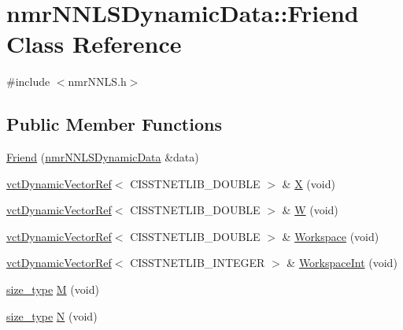 \hypertarget{classnmr_n_n_l_s_dynamic_data_1_1_friend}{}\section{nmr\+N\+N\+L\+S\+Dynamic\+Data\+:\+:Friend Class Reference}
\label{classnmr_n_n_l_s_dynamic_data_1_1_friend}


{\ttfamily \#include $<$nmr\+N\+N\+L\+S.\+h$>$}

\subsection*{Public Member Functions}
\begin{DoxyCompactItemize}
\item 
\hyperlink{classnmr_n_n_l_s_dynamic_data_1_1_friend_a74b215f7248ed5480f8731b4f01cace3}{Friend} (\hyperlink{classnmr_n_n_l_s_dynamic_data}{nmr\+N\+N\+L\+S\+Dynamic\+Data} \&data)
\item 
\hyperlink{classvct_dynamic_vector_ref}{vct\+Dynamic\+Vector\+Ref}$<$ C\+I\+S\+S\+T\+N\+E\+T\+L\+I\+B\+\_\+\+D\+O\+U\+B\+L\+E $>$ \& \hyperlink{classnmr_n_n_l_s_dynamic_data_1_1_friend_abb9b10f244817e0e9f1f36f7f268853a}{X} (void)
\item 
\hyperlink{classvct_dynamic_vector_ref}{vct\+Dynamic\+Vector\+Ref}$<$ C\+I\+S\+S\+T\+N\+E\+T\+L\+I\+B\+\_\+\+D\+O\+U\+B\+L\+E $>$ \& \hyperlink{classnmr_n_n_l_s_dynamic_data_1_1_friend_a992f6c43f68b93ac5e37d85e13adf280}{W} (void)
\item 
\hyperlink{classvct_dynamic_vector_ref}{vct\+Dynamic\+Vector\+Ref}$<$ C\+I\+S\+S\+T\+N\+E\+T\+L\+I\+B\+\_\+\+D\+O\+U\+B\+L\+E $>$ \& \hyperlink{classnmr_n_n_l_s_dynamic_data_1_1_friend_a865f17a9f5a47e81ab50f47045c3389e}{Workspace} (void)
\item 
\hyperlink{classvct_dynamic_vector_ref}{vct\+Dynamic\+Vector\+Ref}$<$ C\+I\+S\+S\+T\+N\+E\+T\+L\+I\+B\+\_\+\+I\+N\+T\+E\+G\+E\+R $>$ \& \hyperlink{classnmr_n_n_l_s_dynamic_data_1_1_friend_ad0207e021e85627127e0524827ecbc58}{Workspace\+Int} (void)
\item 
\hyperlink{classnmr_n_n_l_s_dynamic_data_aff3aaadfea66b14eac2e3e022e41b35b}{size\+\_\+type} \hyperlink{classnmr_n_n_l_s_dynamic_data_1_1_friend_a85cc65d86d3a02b8466894dcb92613e7}{M} (void)
\item 
\hyperlink{classnmr_n_n_l_s_dynamic_data_aff3aaadfea66b14eac2e3e022e41b35b}{size\+\_\+type} \hyperlink{classnmr_n_n_l_s_dynamic_data_1_1_friend_ae25ff16fa349de013e3a272898c38e00}{N} (void)
\end{DoxyCompactItemize}


